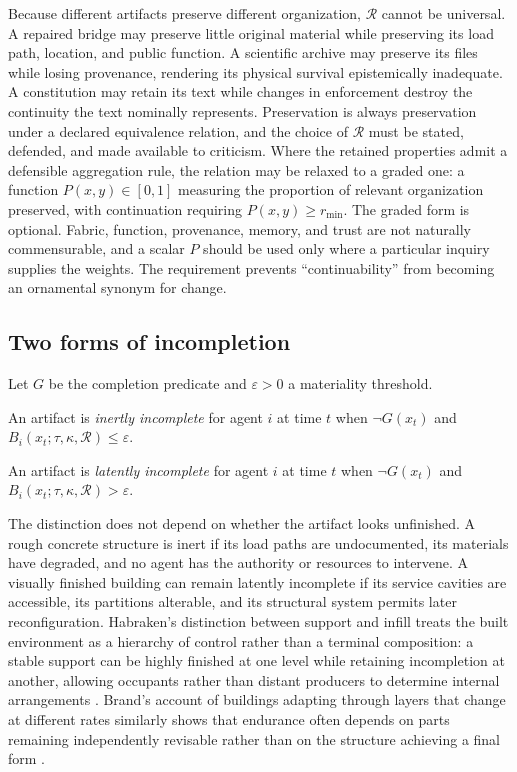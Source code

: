 Because different artifacts preserve different organization, $\mathcal{R}$ cannot be universal. A repaired bridge may preserve little original material while preserving its load path, location, and public function. A scientific archive may preserve its files while losing provenance, rendering its physical survival epistemically inadequate. A constitution may retain its text while changes in enforcement destroy the continuity the text nominally represents. Preservation is always preservation under a declared equivalence relation, and the choice of $\mathcal{R}$ must be stated, defended, and made available to criticism. Where the retained properties admit a defensible aggregation rule, the relation may be relaxed to a graded one: a function $P(x,y)\in[0,1]$ measuring the proportion of relevant organization preserved, with continuation requiring $P(x,y)\geq r_{\min}$. The graded form is optional. Fabric, function, provenance, memory, and trust are not naturally commensurable, and a scalar $P$ should be used only where a particular inquiry supplies the weights. The requirement prevents ``continuability'' from becoming an ornamental synonym for change.

\subsection{Two forms of incompletion}

Let $G$ be the completion predicate and $\varepsilon>0$ a materiality threshold.

\begin{definition}
An artifact is \emph{inertly incomplete} for agent $i$ at time $t$ when $\neg G(x_t)$ and $B_i(x_t;\tau,\kappa,\mathcal{R})\leq\varepsilon$.
\end{definition}

\begin{definition}
An artifact is \emph{latently incomplete} for agent $i$ at time $t$ when $\neg G(x_t)$ and $B_i(x_t;\tau,\kappa,\mathcal{R})>\varepsilon$.
\end{definition}

The distinction does not depend on whether the artifact looks unfinished. A rough concrete structure is inert if its load paths are undocumented, its materials have degraded, and no agent has the authority or resources to intervene. A visually finished building can remain latently incomplete if its service cavities are accessible, its partitions alterable, and its structural system permits later reconfiguration. Habraken's distinction between support and infill treats the built environment as a hierarchy of control rather than a terminal composition: a stable support can be highly finished at one level while retaining incompletion at another, allowing occupants rather than distant producers to determine internal arrangements \cite{habraken1972}. Brand's account of buildings adapting through layers that change at different rates similarly shows that endurance often depends on parts remaining independently revisable rather than on the structure achieving a final form \cite{brand1994}.

